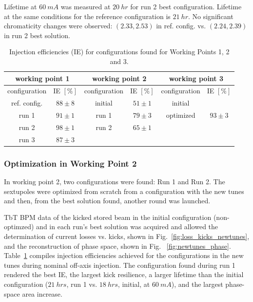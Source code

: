 Lifetime at $60~\unit{mA}$ was measured at $20~\unit{hr}$ for run 2 best configuration. Lifetime at the same conditions for the reference configuration is $21~\unit{hr}$. No significant chromaticity changes were observed: $(2.33, 2.53)$ in ref. config. vs. $(2.24, 2.39)$ in run 2 best solution.
\begin{table}[]
    \caption{Injection efficiencies (IE) for configurations found for Working Points 1, 2 and 3.}
    \centering
    \begin{tabular}{cccccc}
    \hline
    \multicolumn{2}{c}{working point 1} & \multicolumn{2}{c}{working point 2}         & \multicolumn{2}{c}{working point 3}         \\ \hline
    configuration      & IE $[\%]$      & configuration        & IE $[\%]$            & configuration        & IE $[\%]$            \\ \hline
    ref. config.       & $88\pm8$       & initial              & $51\pm1$             & initial              &                      \\
    run 1              & $91\pm1$       & run 1                & $79\pm3$             & optimized            & $93\pm3$             \\
    run 2              & $98\pm1$       & run 2                & $65\pm1    $         &                      &                      \\
    run 3              & $87\pm3$       & \multicolumn{1}{l}{} & \multicolumn{1}{l}{} & \multicolumn{1}{l}{} & \multicolumn{1}{l}{} \\ \hline
    \end{tabular}
    \label{table1}
    \end{table}


\subsubsection{Optimization in Working Point 2}
In working point 2, two configurations were found: Run 1 and Run 2. The sextupoles were optimized from scratch from a configuration with the new tunes and then, from the best solution found, another round was launched.

TbT BPM data of the kicked stored beam  in the initial configuration (non-optimzed) and in each run's best solution was acquired and allowed the determination of current losses vs. kicks, shown in Fig.~\ref{fig:loss_kicks_newtunes}, and the reconstruction of phase space, shown in Fig. ~\ref{fig:newtunes_phase}. Table~\ref{table1} compiles injection efficiencies achieved for the configurations in the new tunes during nominal off-axis injection. The configuration found during run 1 rendered the best IE, the largest kick resilience, a larger lifetime than the initial configuration ($21~\unit{hrs}$, run 1 vs. $18~\unit{hrs}$, initial, at $60~\unit{mA}$), and the largest phase-space area increase.
